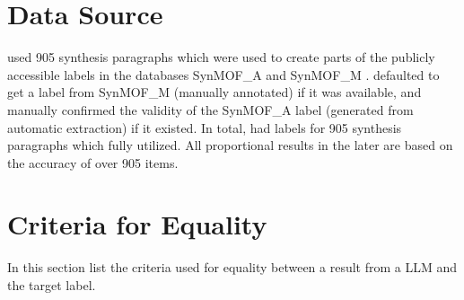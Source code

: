 



\section{Data Source}\label{sec:data}
 used 905 synthesis paragraphs which were used to create parts of the publicly accessible labels in the databases SynMOF\_A and SynMOF\_M \cite{luo_mof_2022}.
 defaulted to get a label from SynMOF\_M (manually annotated) if it was available, and manually confirmed the validity of the SynMOF\_A label (generated from automatic extraction) if it existed.
In total,  had labels for 905 synthesis paragraphs which  fully utilized.
All proportional results in the later  are based on the accuracy of over 905 items.

\section{Criteria for Equality}\label{sec:equality}
In this section  list the criteria used for equality between a result from a \gls{LLM} and the target label.

